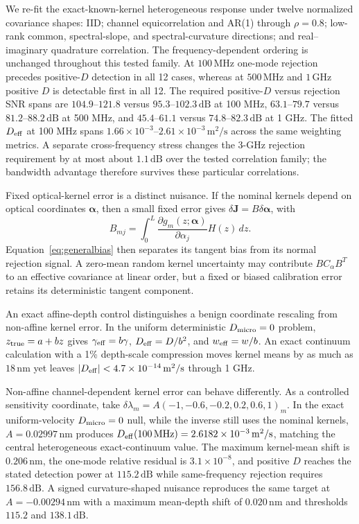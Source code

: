 \documentclass[aps,pra,twocolumn,superscriptaddress,nofootinbib]{revtex4-2}
\begin{document}
We re-fit the exact-known-kernel heterogeneous response under twelve normalized covariance shapes: IID; channel equicorrelation and AR(1) through $\rho=0.8$; low-rank common, spectral-slope, and spectral-curvature directions; and real--imaginary quadrature correlation. The frequency-dependent ordering is unchanged throughout this tested family. At $100\,\mathrm{MHz}$ one-mode rejection precedes positive-$D$ detection in all 12 cases, whereas at $500\,\mathrm{MHz}$ and $1\,\mathrm{GHz}$ positive $D$ is detectable first in all 12. The required positive-$D$ versus rejection SNR spans are $104.9$--$121.8$ versus $95.3$--$102.3\,\mathrm{dB}$ at 100 MHz, $63.1$--$79.7$ versus $81.2$--$88.2\,\mathrm{dB}$ at 500 MHz, and $45.4$--$61.1$ versus $74.8$--$82.3\,\mathrm{dB}$ at 1 GHz. The fitted $D_{\rm eff}$ at 100 MHz spans $1.66\times10^{-3}$--$2.61\times10^{-3}\,\mathrm{m^2/s}$ across the same weighting metrics. A separate cross-frequency stress changes the 3-GHz rejection requirement by at most about $1.1\,\mathrm{dB}$ over the tested correlation family; the bandwidth advantage therefore survives these particular correlations.

Fixed optical-kernel error is a distinct nuisance. If the nominal kernels depend on optical coordinates $\bm\alpha$, then a small fixed error gives $\delta\bm J=B\delta\bm\alpha$, with
\begin{equation}
B_{mj}=\int_0^L\frac{\partial g_m(z;\bm\alpha)}{\partial\alpha_j}H(z)\,dz.
\end{equation}
Equation~\eqref{eq:generalbias} then separates its tangent bias from its normal rejection signal. A zero-mean random kernel uncertainty may contribute $BC_\alpha B^T$ to an effective covariance at linear order, but a fixed or biased calibration error retains its deterministic tangent component.

An exact affine-depth control distinguishes a benign coordinate rescaling from non-affine kernel error. In the uniform deterministic $D_{\rm micro}=0$ problem, $z_{\rm true}=a+bz$ gives $\gamma_{\rm eff}=b\gamma$, $D_{\rm eff}=D/b^2$, and $w_{\rm eff}=w/b$. An exact continuum calculation with a 1\% depth-scale compression moves kernel means by as much as $18\,\mathrm{nm}$ yet leaves $|D_{\rm eff}|<4.7\times10^{-14}\,\mathrm{m^2/s}$ through 1 GHz.

Non-affine channel-dependent kernel error can behave differently. As a controlled sensitivity coordinate, take $\delta\lambda_m=A(-1,-0.6,-0.2,0.2,0.6,1)_m$. In the exact uniform-velocity $D_{\rm micro}=0$ null, while the inverse still uses the nominal kernels, $A=0.02997\,\mathrm{nm}$ produces $D_{\rm eff}(100\,\mathrm{MHz})=2.6182\times10^{-3}\,\mathrm{m^2/s}$, matching the central heterogeneous exact-continuum value. The maximum kernel-mean shift is $0.206\,\mathrm{nm}$, the one-mode relative residual is $3.1\times10^{-8}$, and positive $D$ reaches the stated detection power at $115.2\,\mathrm{dB}$ while same-frequency rejection requires $156.8\,\mathrm{dB}$. A signed curvature-shaped nuisance reproduces the same target at $A=-0.00294\,\mathrm{nm}$ with a maximum mean-depth shift of $0.020\,\mathrm{nm}$ and thresholds $115.2$ and $138.1\,\mathrm{dB}$.
\end{document}
